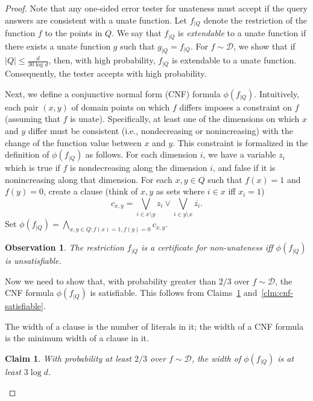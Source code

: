 \documentclass[11pt]{article}
\newtheorem{claim}[theorem]{Claim}
\newtheorem{observation}[theorem]{Observation}
\newcommand{\cD}{\mathcal{D}}
\begin{document}
\begin{proof}
\noindent Note that any one-sided error tester for unateness must accept if the query answers are consistent with a unate function.
Let $f_{|Q}$ denote the restriction of the function $f$ to the points in $Q$. 
We say that $f_{|Q}$ is {\em extendable} to a unate function if there exists a unate function $g$ such that $g_{|Q} = f_{|Q}$.
For $f \sim \cD$, we show that if $|Q| \leq \frac{d}{30 \log d}$, then, with high probability, $f_{|Q}$ is extendable to a unate function. Consequently, the tester accepts with high probability.

Next, we define a conjunctive normal form (CNF) formula $\phi(f_{|Q})$.
Intuitively, each pair $(x,y)$ of domain points on which $f$ differs imposes a constraint on $f$ (assuming that $f$ is unate).
Specifically, at least one of the dimensions on which $x$ and $y$ differ must be consistent (i.e., nondecreasing or nonincreasing) with the change of the function value between $x$ and $y$.
This constraint is formalized in the definition of $\phi(f_{|Q})$ as follows.
For each dimension $i$, we have a variable $z_i$ 
which is true if $f$ is nondecreasing along the dimension $i$, and false if it is nonincreasing along that dimension.
For each $x, y \in Q$ such that $f(x) = 1$ and $f(y) = 0$, create a clause (think of $x,y$ as sets where $i \in x$ iff $x_i = 1$)
$$ c_{x,y} = \bigvee_{i \in x\setminus y} z_i \vee \bigvee_{i \in y\setminus x} \overline{z_i} .$$
Set $\phi(f_{|Q}) = \bigwedge_{x,y \in Q: f(x) = 1, f(y) = 0} c_{x,y}$.

\begin{observation} 
The restriction $f_{|Q}$ is a certificate for non-unateness iff $\phi(f_{|Q})$ is unsatisfiable.
\end{observation}

Now we need to show that, with probability greater than $2/3$ over $f \sim \cD$, the CNF formula $\phi(f_{|Q})$ is satisfiable.
This follows from Claims~\ref{clm:width-of-cnf} and~\ref{clm:cnf-satisfiable}.

The width of a clause is the number of literals in it; the width of a CNF formula is the minimum width of a clause in it.

\begin{claim} \label{clm:width-of-cnf}
With probability at least $2/3$ over $f \sim \cD$, the width of
$\phi(f_{|Q})$ is at least $3\log d$.
\end{claim}


\end{proof}
\end{document}
